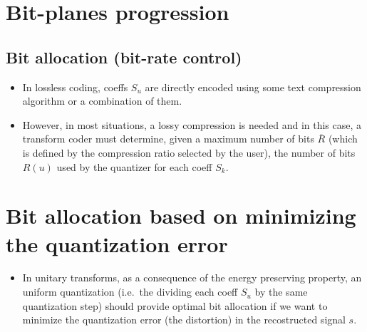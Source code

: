 \section{Bit-planes progression}

\subsection{Bit allocation (bit-rate control)}
\begin{itemize}
\item
  In lossless coding, coeffs \(S_u\) are directly encoded using some
  text compression algorithm or a combination of them.
\item
  However, in most situations, a lossy compression is needed and in this
  case, a transform coder must determine, given a maximum number of bits
  \(\overline{R}\) (which is defined by the compression ratio selected
  by the user), the number of bits \(R(u)\) used by the quantizer for
  each coeff \(S_k\).
\end{itemize}

\section{Bit allocation based on minimizing the quantization error}
\begin{itemize}
\tightlist
\item
  In unitary transforms, as a consequence of the energy preserving
  property, an uniform quantization (i.e.~the dividing each coeff
  \(S_u\) by the same quantization step) should provide optimal bit
  allocation if we want to minimize the quantization error (the
  distortion) in the recostructed signal \(s\).
\end{itemize}

